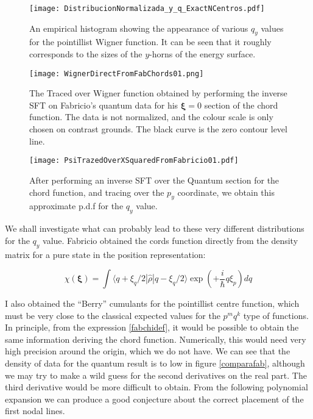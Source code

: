 \documentclass[a4paper,12pt]{article}
\newcommand{\ihb}{\frac{i}{\hbar}}
\newcommand{\xifase}{ {\boldsymbol{\xi}} }
\newcommand{\bra}[1]{\langle #1|}
\newcommand{\ket}[1]{|#1\rangle}
\begin{document}
\begin{figure}[h]
  \centering     
    \texttt{[image: DistribucionNormalizada\_y\_q\_ExactNCentros.pdf]}
  \caption{An empirical histogram showing the appearance of various $q_y$ values
for the pointillist Wigner function. It can be seen that it roughly corresponds
to the sizes of the $y$-horns of the energy surface.}
  \label{histoqy}
\end{figure}


\begin{figure}[h]
  \centering     
    \texttt{[image: WignerDirectFromFabChords01.png]}
  \caption{The Traced over Wigner function obtained by performing the inverse
SFT on Fabricio's quantum data for his $\xifase=0$ section of the chord function.
The data is not normalized, and the colour scale is only chosen on contrast grounds.
The black curve is the zero contour level line. }
  \label{WignerFromFab}
\end{figure}


\begin{figure}[h]
  \centering     
    \texttt{[image: PsiTrazedOverXSquaredFromFabricio01.pdf]}
    \caption{After performing an inverse SFT over the Quantum section for the chord function,
and tracing over the $p_y$ coordinate, we obtain this approximate p.d.f for the $q_y$
value.}
    \label{FabProb}
\end{figure}


We shall investigate what can probably lead to these very different
distributions for the $q_y$ value. Fabricio obtained the cords function
directly from the density matrix for a pure state in the position representation:

\begin{equation}\label{fabchidef}
\chi(\xifase)=\int \bra{q+\xi_q/2}\hat{\rho}\ket{q-\xi_q/2}\exp (+\ihb q \xi_p) d q
\end{equation}

I also obtained the ``Berry'' cumulants for the pointillist centre function, which
must be very close to the classical expected values for the $p^m q^k$  type of
functions. In principle, from the expression \ref{fabchidef}, it would be possible
to obtain the same information deriving the chord function. Numerically, this would
need very high precision around the origin, which we do not have. We can see
that the density of data for the quantum result is to low in figure \ref{comparafab},
although we may try to make a wild guess for the second derivatives
on the real part. The third derivative would be more difficult to obtain.
From the following polynomial expansion we can produce a good conjecture
about the correct placement of the first nodal lines.
\end{document}
